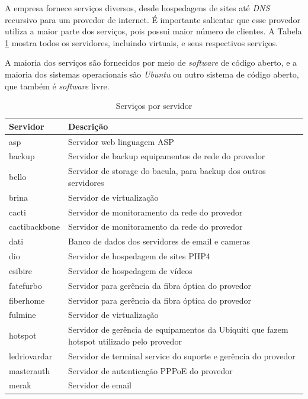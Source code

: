 A empresa fornece serviços diversos, desde hospedagens de sites até \textit{DNS} recursivo para um provedor de internet. É importante
salientar que esse provedor utiliza a maior parte dos serviços, pois possui maior número de clientes.
A Tabela \ref{tab:servporservidor} mostra todos os servidores, incluindo virtuais, e seus respectivos serviços.

A maioria dos serviços são fornecidos por meio de \textit{software} de código aberto, e a maioria dos sistemas operacionais são \textit{Ubuntu}
ou outro sistema de código aberto, que também é \textit{software} livre.

\begin{table}
\caption {Serviços por servidor}
\label{tab:servporservidor}
\begin{center}
\begin{tabular}{|l|p{12cm}|}\hline
Servidor & Descrição\\\hline
asp & Servidor web linguagem ASP\\\hline
backup & Servidor de backup equipamentos de rede do provedor\\\hline
bello & Servidor de storage do bacula, para backup dos outros servidores\\\hline
brina & Servidor de virtualização\\\hline
cacti & Servidor de monitoramento da rede do provedor\\\hline
cactibackbone & Servidor de monitoramento da rede do provedor\\\hline
dati & Banco de dados dos servidores de email e cameras\\\hline
dio & Servidor de hospedagem de sites PHP4\\\hline
esibire & Servidor de hospedagem de vídeos\\\hline
fatefurbo & Servidor para gerência da fibra óptica do provedor\\\hline
fiberhome & Servidor para gerência da fibra óptica do provedor\\\hline
fulmine & Servidor de virtualização\\\hline
hotspot & Servidor de gerência de equipamentos da Ubiquiti que fazem hotspot utilizado pelo provedor\\\hline
ledriovardar & Servidor de terminal service do suporte e gerência do provedor\\\hline
masterauth & Servidor de autenticação PPPoE do provedor\\\hline
merak & Servidor de email\\\hline

\end{tabular}
\end{center}
\end{table}
